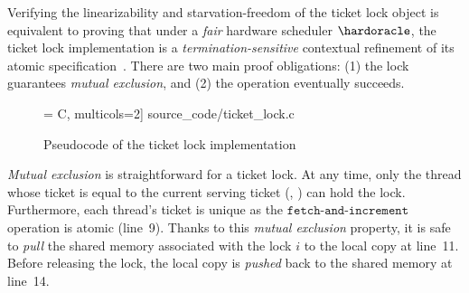 Verifying the linearizability and starvation-freedom of the ticket
lock object is equivalent to proving that under a {\em fair} hardware
scheduler $\hardoracle$, the ticket lock implementation is a {\em
  termination-sensitive} contextual refinement of its atomic
specification~\cite{liang13,lili16}.  There are two main proof
obligations: (1) the lock guarantees \emph{mutual exclusion}, and (2)
the  operation eventually succeeds.

\begin{figure}
 = C, multicols=2] {source_code/ticket_lock.c}
\caption{Pseudocode of the ticket lock implementation}
\label{fig:exp:ticket_lock}
\end{figure}
 
\emph{Mutual exclusion} is straightforward for a ticket lock.  At any
time, only the thread whose ticket is equal to the current serving
ticket (\ie, ) can hold the lock.  Furthermore, each
thread's ticket is unique as the $\texttt{fetch-and-increment}$
operation is atomic (line~9).  Thanks to this \emph{mutual exclusion}
property, it is safe to \emph{pull} the shared memory associated with
the lock $i$ to the local copy at line~11.  Before releasing the lock,
the local copy is \emph{pushed} back to the shared memory at line~14.

